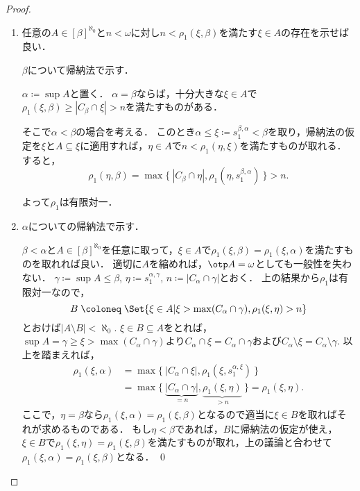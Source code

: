 \documentclass[a4j]{ltjsarticle}
\renewcommand{\defeq}{\mathrel{\coloneq}}
\begin{document}
\begin{proof}
 \begin{enumerate}
  \item 任意の$A \in [\beta]^{\aleph_0}$と$n < \omega$に対し$n < \rho_1(\xi, \beta)$を満たす$\xi \in A$の存在を示せば良い．

        $\beta$について帰納法で示す．

        $\alpha \defeq \sup A$と置く．
        $\alpha = \beta$ならば，十分大きな$\xi \in A$で$\rho_1(\xi, \beta) \geq |C_\beta \cap \xi| > n$を満たすものがある．

        そこで$\alpha < \beta$の場合を考える．
        このとき$\alpha \leq \xi \defeq s^{\beta,\alpha}_1 < \beta$を取り，帰納法の仮定を$\xi$と$A \subseteq \xi$に適用すれば，$\eta \in A$で$n < \rho_1(\eta, \xi)$を満たすものが取れる．すると，
        \[
         \rho_1(\eta, \beta) = \max\{\ \left|C_\beta \cap \eta\right|, \rho_1(\eta, s^{\beta,\alpha}_1)\ \} > n.
        \]

        よって$\rho_1$は有限対一．
  \item $\alpha$についての帰納法で示す．

        $\beta < \alpha$と$A \in [\beta]^{\aleph_0}$を任意に取って，$\xi \in A$で$\rho_1(\xi, \beta) = \rho_1(\xi, \alpha)$を満たすものを取れれば良い．
        適切に$A$を縮めれば，$\otp A = \omega$としても一般性を失わない．
        $\gamma \defeq \sup A \leq \beta$, $\eta \defeq s^{\alpha,\gamma}_1$, $n \defeq |C_\alpha \cap \gamma|$とおく．
        上の結果から$\rho_1$は有限対一なので，
        \[
         B \defeq \Set{\xi \in A | \xi > \max(C_\alpha \cap \gamma), \rho_1(\xi, \eta) > n }
        \]
        とおけば$|A \setminus B| < \aleph_0$.
        $\xi \in B \subseteq A$をとれば，$\sup A = \gamma \geq \xi > \max(C_\alpha \cap \gamma)$より$C_\alpha \cap \xi = C_\alpha \cap \gamma$および$C_\alpha \setminus \xi = C_\alpha \setminus \gamma$.
        以上を踏まえれば，
        \begin{align*}
         \rho_1(\xi, \alpha) &= \max \{\ |C_\alpha \cap \xi|, \rho_1(\xi, s^{\alpha,\xi}_1) \ \}\\
         &= \max \{\ \underbrace{|C_\alpha \cap \gamma |}_{= n}, \underbrace{\rho_1(\xi, \eta)}_{> n} \ \} = \rho_1(\xi, \eta).
        \end{align*}
        ここで，$\eta = \beta$なら$\rho_1(\xi, \alpha) = \rho_1(\xi, \beta)$となるので適当に$\xi \in B$を取ればそれが求めるものである．
        もし$\eta < \beta$であれば，$B$に帰納法の仮定が使え，$\xi \in B$で$\rho_1(\xi, \eta) = \rho_1(\xi, \beta)$を満たすものが取れ，上の議論と合わせて$\rho_1(\xi, \alpha) = \rho_1(\xi, \beta)$となる． \qed
 \end{enumerate}
\end{proof}
\end{document}
